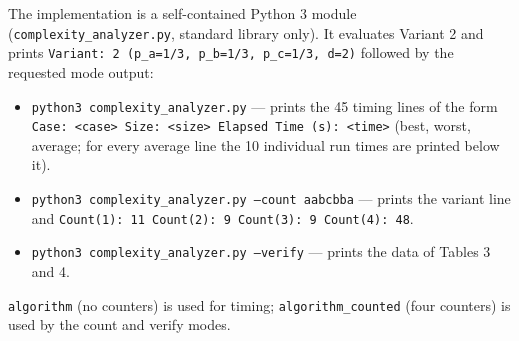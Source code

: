\documentclass[11pt]{article}
\theoremstyle{remark}
\begin{document}
The implementation is a self-contained Python 3 module (\texttt{complexity\_analyzer.py}, standard library only). It evaluates Variant 2 and prints \texttt{Variant: 2 (p\_a=1/3, p\_b=1/3, p\_c=1/3, d=2)} followed by the requested mode output:
\begin{itemize}[nosep]
\item \texttt{python3 complexity\_analyzer.py} --- prints the 45 timing lines of the form
  \texttt{Case: <case> Size: <size> Elapsed Time (s): <time>} (best, worst, average; for every
  average line the 10 individual run times are printed below it).
\item \texttt{python3 complexity\_analyzer.py --count aabcbba} --- prints the variant line
  and \texttt{Count(1): 11 Count(2): 9 Count(3): 9 Count(4): 48}.
\item \texttt{python3 complexity\_analyzer.py --verify} --- prints the data of Tables 3 and 4.
\end{itemize}
\texttt{algorithm} (no counters) is used for timing; \texttt{algorithm\_counted} (four
counters) is used by the count and verify modes.
\end{document}
